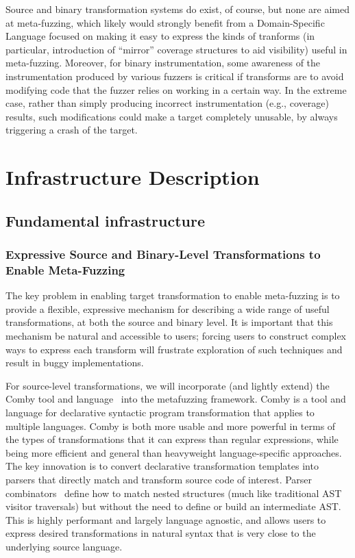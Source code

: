 Source and binary transformation systems do exist, of course, but none are 
aimed at meta-fuzzing, which likely would strongly benefit from a 
Domain-Specific Language focused on making it easy to express the kinds of 
tranforms (in particular, introduction of ``mirror'' coverage structures to aid 
visibility) useful in meta-fuzzing.  Moreover, for binary instrumentation, some 
awareness of the instrumentation produced by various fuzzers is critical if 
transforms are to avoid modifying code that the fuzzer relies on working in a 
certain way.  In the extreme case, rather than simply producing incorrect 
instrumentation (e.g., coverage) results, such modifications could make a 
target completely unusable, by always triggering a crash of the target.

\section{Infrastructure Description}

\subsection{Fundamental infrastructure}




\subsubsection{Expressive Source and Binary-Level Transformations to 
Enable Meta-Fuzzing}

The key problem in enabling target transformation to enable meta-fuzzing is to
provide a flexible, expressive mechanism for describing a wide range of useful
transformations, at both the source and binary level.  It is important that this
mechanism be natural and accessible to users; forcing users to 
construct complex ways to express each transform will frustrate exploration of such 
techniques and result in buggy implementations. 

For source-level transformations, we will incorporate (and lightly extend) the
Comby tool and language~\cite{rvt-ppc,comby-github} into the metafuzzing
framework.  Comby is a tool and language for declarative syntactic program
transformation that applies to multiple languages. Comby is both more usable and
more powerful in terms of the types of transformations that it can express than
regular expressions, while being more efficient and general than heavyweight
language-specific approaches. The key innovation is to convert declarative
transformation templates into parsers that directly match and transform source
code of interest. Parser combinators~\cite{Hutton96monadicparser} define how to
match nested structures (much like traditional AST visitor traversals) but
without the need to define or build an intermediate AST. This is highly
performant and largely language agnostic, and allows users to express desired
transformations in natural syntax that is very close to the underlying source
language. 


